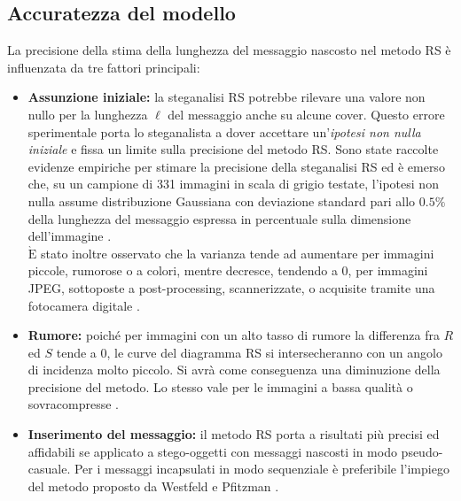 \subsection{Accuratezza del modello}
La precisione della stima della lunghezza del messaggio nascosto nel metodo RS è influenzata da tre fattori principali:
\begin{itemize}
\item \textbf{Assunzione iniziale:} la steganalisi RS potrebbe rilevare una valore non nullo per la lunghezza $\ell$ del messaggio anche su alcune cover. Questo errore sperimentale porta lo steganalista a dover accettare un'\textit{ipotesi non nulla iniziale} e fissa un limite sulla precisione del metodo RS. Sono state raccolte evidenze empiriche per stimare la precisione della steganalisi RS ed è emerso che, su un campione di 331 immagini in scala di grigio testate, l'ipotesi non nulla assume distribuzione Gaussiana con deviazione standard pari allo $0.5\%$ della lunghezza del messaggio espressa in percentuale sulla dimensione dell'immagine \cite{fried1}.\\$\mathrm{\grave{E}}$ stato inoltre osservato che la varianza tende ad aumentare per immagini piccole, rumorose o a colori, mentre decresce, tendendo a 0, per immagini JPEG, sottoposte a post-processing, scannerizzate, o acquisite tramite una fotocamera digitale \cite{fried1, fried2}. 
\item \textbf{Rumore:} poiché per immagini con un alto tasso di rumore la differenza fra $R$ ed $S$ tende a 0, le curve del diagramma RS si intersecheranno con un angolo di incidenza molto piccolo. Si avrà come conseguenza una diminuzione della precisione del metodo. Lo stesso vale per le immagini a bassa qualità o sovracompresse \cite{fried1}.
\item \textbf{Inserimento del messaggio:} il metodo RS porta a risultati più precisi ed affidabili se applicato a stego-oggetti con messaggi nascosti in modo pseudo-casuale. Per i messaggi incapsulati in modo sequenziale è preferibile l'impiego del metodo proposto da Westfeld e Pfitzman \cite{chisq}.
\end{itemize}
